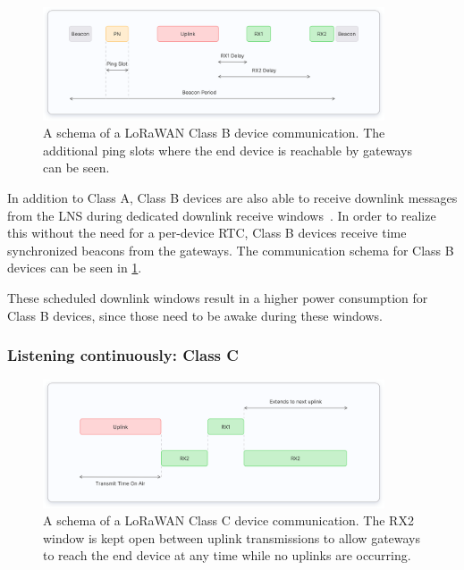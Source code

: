 \begin{figure}[htbp]
    \centering
    \includegraphics[width=0.9\textwidth]{pictures/device-classes/class-b.png}
    \caption{
        A schema of a \ac{LoRaWAN} Class B device communication.
        The additional ping slots where the end device is reachable by gateways can be seen.~\protect\cite{the_things_industries_bv_device_nodate}
    }\label{pic:lorawan-device-class-b-schema}
\end{figure}

In addition to Class A, Class B devices are also able to receive downlink messages from the \ac{LNS} during dedicated downlink receive windows~\cite[p. 67]{lora_alliance_inc_lorawan_specification_2017}.
In order to realize this without the need for a per-device \ac{RTC}, Class B devices receive time synchronized beacons from the gateways.
The communication schema for Class B devices can be seen in \cref{pic:lorawan-device-class-b-schema}.

These scheduled downlink windows result in a higher power consumption for Class B devices, since those need to be awake during these windows.

\subsubsection{Listening continuously: Class C}

\begin{figure}[htbp]
    \centering
    \includegraphics[width=0.9\textwidth]{pictures/device-classes/class-c.png}
    \caption{
        A schema of a \ac{LoRaWAN} Class C device communication.
        The RX2 window is kept open between uplink transmissions to allow gateways to reach the end device at any time while no uplinks are occurring.~\protect\cite{the_things_industries_bv_device_nodate}
    }\label{pic:lorawan-device-class-c-schema}
\end{figure}


